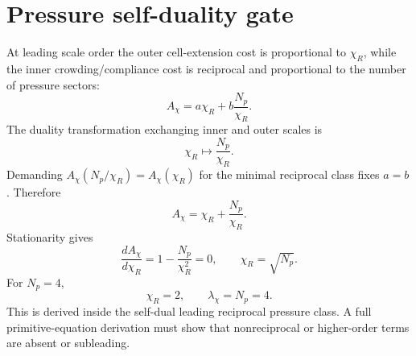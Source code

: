 \section{Pressure self-duality gate}
At leading scale order the outer cell-extension cost is proportional to
\(\chi_R\), while the inner crowding/compliance cost is reciprocal and
proportional to the number of pressure sectors:
\[
  A_\chi=a\chi_R+b\frac{N_p}{\chi_R}.
\]
The duality transformation exchanging inner and outer scales is
\[
  \chi_R\mapsto\frac{N_p}{\chi_R}.
\]
Demanding \(A_\chi(N_p/\chi_R)=A_\chi(\chi_R)\) for the minimal reciprocal
class fixes \(a=b\). Therefore
\[
  A_\chi=\chi_R+\frac{N_p}{\chi_R}.
\]
Stationarity gives
\[
  \frac{dA_\chi}{d\chi_R}=1-\frac{N_p}{\chi_R^2}=0,
  \qquad
  \chi_R=\sqrt{N_p}.
\]
For \(N_p=4\),
\[
  \chi_R=2,
  \qquad
  \lambda_\chi=N_p=4.
\]
This is derived inside the self-dual leading reciprocal pressure class. A full
primitive-equation derivation must show that nonreciprocal or higher-order
terms are absent or subleading.
